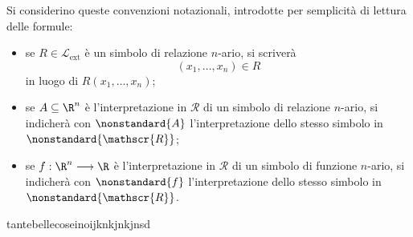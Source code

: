 {    Si considerino queste convenzioni notazionali, introdotte per semplicità di lettura delle formule: \begin{itemize}
        \item se $ R \in \mathcal{L}_{\text{ext}}  $ è un simbolo di relazione $ n $-ario, si scriverà \begin{equation*}
            (x_1,\dots,x_{n} ) \in R
        \end{equation*}in luogo di $ R(x_1,\dots,x_{n} ) $; 
        \item se $ A \subseteq \R^{n} $ è l'interpretazione in $ \mathscr{R} $ di un simbolo di relazione $ n $-ario, si indicherà con $ \nonstandard{A} $ l'interpretazione dello stesso simbolo in $ \nonstandard{\mathscr{R}} $;
        \item se $ f: \R^{n} \longrightarrow \R$ è l'interpretazione in $ \mathscr{R} $ di un simbolo di funzione $ n $-ario, si indicherà con $ \nonstandard{f} $ l'interpretazione dello stesso simbolo in $ \nonstandard{\mathscr{R}} $.
    \end{itemize}


}{tantebellecoseinoijknkjnkjnsd}{}

